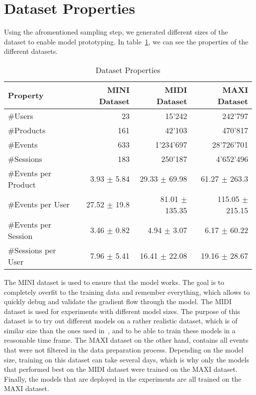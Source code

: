 \section{Dataset Properties}\label{sec:dataset_properties}
Using the afromentioned sampling step, we generated different sizes of the dataset to enable model prototyping.
In table~\ref{tab:dataset_stats}, we can see the properties of the different datasets.
\begin{table}[t]
    \centering
    \begin{tabular}{lrrr}\toprule
        \textbf{Property} & \textbf{MINI Dataset} & \textbf{MIDI Dataset} & \textbf{MAXI Dataset} \\ \midrule
        \#Users & 23 & 15'242 & 242'797 \\
        \#Products & 161 & 42'103 & 470'817 \\
        \#Events & 633 & 1'234'697 & 28'726'701 \\
        \#Sessions & 183 & 250'187 & 4'652'496 \\ \midrule
        \#Events per Product & 3.93 $\pm$ 5.84 & 29.33 $\pm$ 69.98 & 61.27 $\pm$ 263.3 \\
        \#Events per User & 27.52 $\pm$ 19.8 & 81.01 $\pm$ 135.35 & 115.05 $\pm$ 215.15 \\
        \#Events per Session & 3.46 $\pm$ 0.82 & 4.94 $\pm$ 3.07 & 6.17 $\pm$ 60.22 \\ 
        \#Sessions per User & 7.96 $\pm$ 5.41 & 16.41 $\pm$ 22.08 & 19.16 $\pm$ 28.67 \\ \bottomrule
    \end{tabular}
    \caption{Dataset Properties}
    \label{tab:dataset_stats}
\end{table}
The MINI dataset is used to ensure that the model works. 
The goal is to completely overfit to the training data and remember everything, which allows to quickly debug and validate the gradient flow through the model.
The MIDI dataset is used for experiments with different model sizes.
The purpose of this dataset is to try out different models on a rather realistic dataset, which is of similar size than the ones used in~\cite{hierarchical}, and to be able to train these models in a reasonable time frame.
The MAXI dataset on the other hand, contains all events that were not filtered in the data preparation process.
Depending on the model size, training on this dataset can take several days, which is why only the models that performed best on the MIDI dataset were trained on the MAXI dataset.
Finally, the models that are deployed in the experiments are all trained on the MAXI dataset.